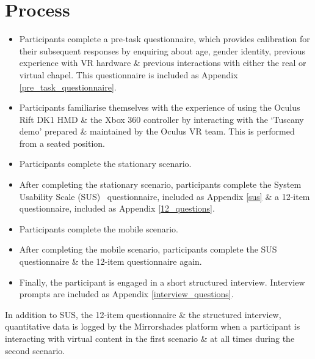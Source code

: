 \section{Process}
\begin{itemize}
	\item Participants complete a pre-task questionnaire, which provides calibration for their subsequent responses by enquiring about age, gender identity, previous experience with VR hardware \& previous interactions with either the real or virtual chapel. This questionnaire is included as Appendix \ref{pre_task_questionnaire}.
	
	\item Participants familiarise themselves with the experience of using the Oculus Rift DK1 HMD \& the Xbox 360 controller by interacting with the `Tuscany demo' prepared \& maintained by the Oculus VR team. This is performed from a seated position.
	
	\item Participants complete the stationary scenario.
	
	\item After completing the stationary scenario, participants complete the System Usability Scale (SUS)~\cite{Brooke1996} questionnaire, included as Appendix \ref{sus} \& a 12-item questionnaire, included as Appendix \ref{12_questions}.
	
	\item Participants complete the mobile scenario.
	
	\item After completing the mobile scenario, participants complete the SUS questionnaire \& the 12-item questionnaire again.
	
	\item Finally, the participant is engaged in a short structured interview. Interview prompts are included as Appendix \ref{interview_questions}.
\end{itemize}

In addition to SUS, the 12-item questionnaire \& the structured interview, quantitative data is logged by the Mirrorshades platform when a participant is interacting with virtual content in the first scenario \& at all times during the second scenario.

